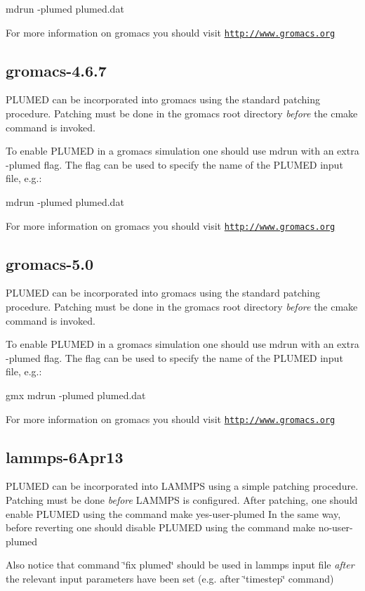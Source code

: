 mdrun -\/plumed plumed.\+dat

For more information on gromacs you should visit \href{http://www.gromacs.org}{\tt http\+://www.\+gromacs.\+org} \hypertarget{gromacs-4-6-7}{}\subsection{gromacs-\/4.6.7}\label{gromacs-4-6-7}
P\+L\+U\+M\+E\+D can be incorporated into gromacs using the standard patching procedure. Patching must be done in the gromacs root directory {\itshape before} the cmake command is invoked.

To enable P\+L\+U\+M\+E\+D in a gromacs simulation one should use mdrun with an extra -\/plumed flag. The flag can be used to specify the name of the P\+L\+U\+M\+E\+D input file, e.\+g.\+:

mdrun -\/plumed plumed.\+dat

For more information on gromacs you should visit \href{http://www.gromacs.org}{\tt http\+://www.\+gromacs.\+org} \hypertarget{gromacs-5-0}{}\subsection{gromacs-\/5.0}\label{gromacs-5-0}
P\+L\+U\+M\+E\+D can be incorporated into gromacs using the standard patching procedure. Patching must be done in the gromacs root directory {\itshape before} the cmake command is invoked.

To enable P\+L\+U\+M\+E\+D in a gromacs simulation one should use mdrun with an extra -\/plumed flag. The flag can be used to specify the name of the P\+L\+U\+M\+E\+D input file, e.\+g.\+:

gmx mdrun -\/plumed plumed.\+dat

For more information on gromacs you should visit \href{http://www.gromacs.org}{\tt http\+://www.\+gromacs.\+org} \hypertarget{lammps-6Apr13}{}\subsection{lammps-\/6\+Apr13}\label{lammps-6Apr13}
P\+L\+U\+M\+E\+D can be incorporated into L\+A\+M\+M\+P\+S using a simple patching procedure. Patching must be done {\itshape before} L\+A\+M\+M\+P\+S is configured. After patching, one should enable P\+L\+U\+M\+E\+D using the command make yes-\/user-\/plumed In the same way, before reverting one should disable P\+L\+U\+M\+E\+D using the command make no-\/user-\/plumed

Also notice that command \char`\"{}fix plumed\char`\"{} should be used in lammps input file {\itshape after} the relevant input parameters have been set (e.\+g. after \char`\"{}timestep\char`\"{} command)

